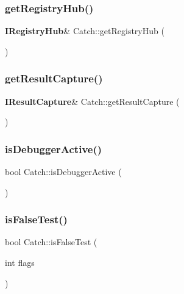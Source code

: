 \mbox{\label{namespace_catch_ac24b072979540bfd922e7d46e899f46f}} 
\subsubsection{get\+Registry\+Hub()}
{\footnotesize\ttfamily \textbf{ I\+Registry\+Hub}\& Catch\+::get\+Registry\+Hub (\begin{DoxyParamCaption}{ }\end{DoxyParamCaption})}

\mbox{\label{namespace_catch_aff60c1de6ac6cea30175d70e33d83c8e}} 
\subsubsection{get\+Result\+Capture()}
{\footnotesize\ttfamily \textbf{ I\+Result\+Capture}\& Catch\+::get\+Result\+Capture (\begin{DoxyParamCaption}{ }\end{DoxyParamCaption})}

\mbox{\label{namespace_catch_ab079497368fb1df25af39ad494d2a241}} 
\subsubsection{is\+Debugger\+Active()}
{\footnotesize\ttfamily bool Catch\+::is\+Debugger\+Active (\begin{DoxyParamCaption}{ }\end{DoxyParamCaption})}

\mbox{\label{namespace_catch_a93ef4e3e307a2021ca0d41b32c0e54b0}} 
\subsubsection{is\+False\+Test()}
{\footnotesize\ttfamily bool Catch\+::is\+False\+Test (\begin{DoxyParamCaption}\item[{int}]{flags }\end{DoxyParamCaption})\hspace{0.3cm}{\ttfamily [inline]}}

